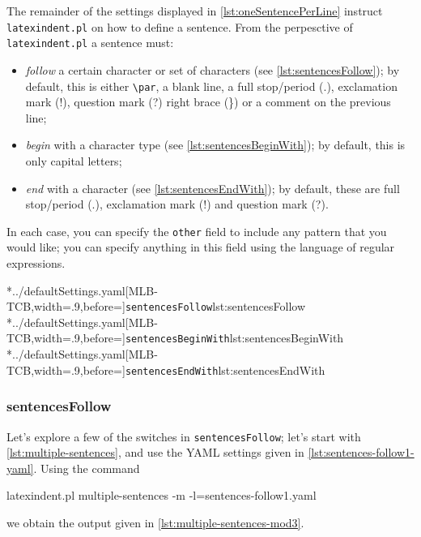 	The remainder of the settings displayed in \vref{lst:oneSentencePerLine} instruct
	\texttt{latexindent.pl} on how to define a sentence. From the perpesctive of
	\texttt{latexindent.pl} a sentence must:
	\begin{itemize}
		\item \emph{follow} a certain character or set of characters (see
		      \cref{lst:sentencesFollow}); by default, this is either \lstinline!\par!, a
		      blank line, a full stop/period (.), exclamation mark (!), question mark (?) right brace
		      (\}) or a comment on the previous line;
		\item \emph{begin} with a character type (see \cref{lst:sentencesBeginWith}); by
		      default, this is only capital letters;
		\item \emph{end} with a character (see \cref{lst:sentencesEndWith}); by
		      default, these are full stop/period (.), exclamation mark (!) and question mark (?).
	\end{itemize}
	In each case, you can specify the \texttt{other} field to include any
	pattern that you would like; you can specify anything in this field using the language of
	regular expressions.

        \begin{cmhtcbraster}[raster columns=3,
            raster left skip=-3.5cm,
                             raster right skip=-2cm,
                             raster column skip=.06\linewidth]
			\cmhlistingsfromfile[style=sentencesFollow]*{../defaultSettings.yaml}[MLB-TCB,width=.9\linewidth,before=\centering]{\texttt{sentencesFollow}}{lst:sentencesFollow}
			\cmhlistingsfromfile[style=sentencesBeginWith]*{../defaultSettings.yaml}[MLB-TCB,width=.9\linewidth,before=\centering]{\texttt{sentencesBeginWith}}{lst:sentencesBeginWith}
			\cmhlistingsfromfile[style=sentencesEndWith]*{../defaultSettings.yaml}[MLB-TCB,width=.9\linewidth,before=\centering]{\texttt{sentencesEndWith}}{lst:sentencesEndWith}
        \end{cmhtcbraster}

\subsubsection{sentencesFollow}
	Let's explore a few of the switches in \texttt{sentencesFollow}; let's start with
	\vref{lst:multiple-sentences}, and use the YAML settings given in
	\cref{lst:sentences-follow1-yaml}. Using the command
	\begin{commandshell}
latexindent.pl multiple-sentences -m -l=sentences-follow1.yaml
\end{commandshell}
	we obtain the output given in \cref{lst:multiple-sentences-mod3}.

